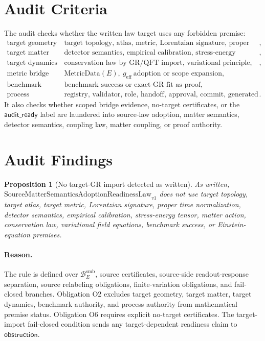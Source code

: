 \documentclass[11pt]{article}
\newcommand{\SMSAR}{\mathrm{SourceMatterSemanticsAdoptionReadinessLaw}_{v1}}
\newcommand{\BridgeDom}{\mathcal B^{\mathrm{smb}}_E}
\newcommand{\AuditReady}{\mathsf{audit\_ready}}
\newcommand{\Obstruction}{\mathsf{obstruction}}
\newcommand{\MetricData}{\mathrm{MetricData}}
\newcommand{\geff}{g_{\mathrm{eff}}}
\newtheorem{proposition}{Proposition}
\begin{document}
\section{Audit Criteria}

The audit checks whether the written law target uses any forbidden premise:
\[
\begin{array}{ll}
\text{target geometry} & \text{target topology, atlas, metric, Lorentzian signature, proper time},\\
\text{target matter} & \text{detector semantics, empirical calibration, stress-energy tensor, matter action},\\
\text{target dynamics} & \text{conservation law by GR/QFT import, variational principle, Einstein-equation premise},\\
\text{metric bridge} & \MetricData(E),\ \geff\ \text{adoption or scope expansion},\\
\text{benchmark authority} & \text{benchmark success or exact-GR fit as proof},\\
\text{process authority} & \text{registry, validator, role, handoff, approval, commit, generated derivative, local cache}.
\end{array}
\]
It also checks whether scoped bridge evidence, no-target certificates, or the
\(\AuditReady\) label are laundered into source-law adoption, matter semantics,
detector semantics, coupling law, matter coupling, or proof authority.

\section{Audit Findings}

\begin{proposition}[No target-GR import detected as written]
As written, \(\SMSAR\) does not use target topology, target atlas, target
metric, Lorentzian signature, proper time normalization, detector semantics,
empirical calibration, stress-energy tensor, matter action, conservation law,
variational field equations, benchmark success, or Einstein-equation premises.
\end{proposition}

\paragraph{Reason.}
The rule is defined over \(\BridgeDom\), source certificates, source-side
readout-response separation, source relabeling obligations, finite-variation
obligations, and fail-closed branches. Obligation O2 excludes target
geometry, target matter, target dynamics, benchmark authority, and process
authority from mathematical premise status. Obligation O6 requires explicit
no-target certificates. The target-import fail-closed condition sends any
target-dependent readiness claim to \(\Obstruction\).
\end{document}
